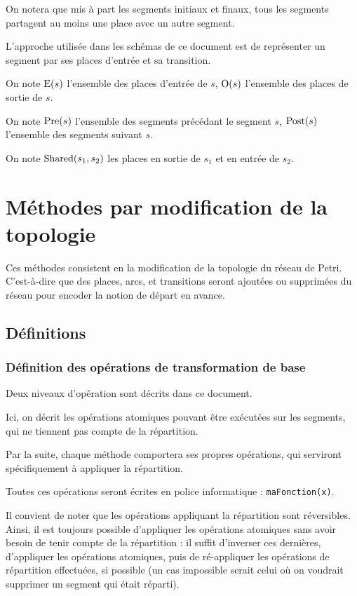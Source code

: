 On notera que mis à part les segments initiaux et finaux, tous les segments partagent au moins une place avec un autre segment.

L'approche utilisée dans les schémas de ce document est de représenter un segment par ses places d'entrée et sa transition.

\begin{mynot}
On note $\operatorname{E}(s)$ l'ensemble des places d'entrée de $s$, $\operatorname{O}(s)$ l'ensemble des places de sortie de $s$.
\end{mynot}

\begin{mynot}
On note $\operatorname{Pre}(s)$ l'ensemble des segments précédant le segment $s$, $\operatorname{Post}(s)$ l'ensemble des segments suivant $s$.
\end{mynot}

\begin{mynot}
On note $\operatorname{Shared}(s_1, s_2)$ les places en sortie de $s_1$ et en entrée de $s_2$.
\end{mynot}

\section{Méthodes par modification de la topologie}
Ces méthodes consistent en la modification de la topologie du réseau de Petri. C'est-à-dire que des places, arcs, et transitions seront ajoutées ou supprimées du réseau pour encoder la notion de départ en avance.

\subsection{Définitions}
\subsubsection{Définition des opérations de transformation de base}
Deux niveaux d'opération sont décrits dans ce document.

Ici, on décrit les opérations atomiques pouvant être exécutées sur les segments, qui ne tiennent pas compte de la répartition. 

Par la suite, chaque méthode comportera ses propres opérations, qui serviront spécifiquement à appliquer la répartition. 

Toutes ces opérations seront écrites en police informatique : \texttt{maFonction(x)}.

Il convient de noter que les opérations appliquant la répartition sont réversibles. Ainsi, il est toujours possible d'appliquer les opérations atomiques sans avoir besoin de tenir compte de la répartition : il suffit d'inverser ces dernières, d'appliquer les opérations atomiques, puis de ré-appliquer les opérations de répartition effectuées, si possible (un cas impossible serait celui où on voudrait supprimer un segment qui était réparti).

